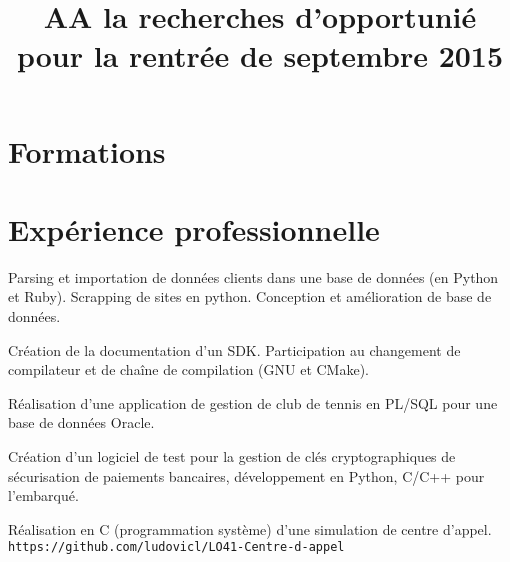 \documentclass[11pt,a4paper]{moderncv}
\title{AA la recherches d'opportunié pour la rentrée de septembre 2015}
\begin{document}
\maketitle
\vspace{-3.5em}


\section{Formations}




\section{Expérience professionnelle}

 {}{Parsing et importation de données clients dans une base de données (en Python et Ruby). Scrapping de sites en python. Conception et amélioration de base de données.}

 {}{Création de la documentation d'un SDK. Participation au changement de compilateur et de chaîne de compilation (GNU et CMake).}

 {}{Réalisation d'une application de gestion de club de tennis en PL/SQL pour une base de données Oracle.}

 {}{Création d'un logiciel de test pour la gestion de clés cryptographiques de sécurisation de paiements bancaires, développement en Python, C/C++ pour 
l'embarqué.}

 {}{Réalisation en C (programmation système) d’une simulation de centre d’appel.  \texttt{https://github.com/ludovicl/LO41-Centre-d-appel}}
\end{document}

